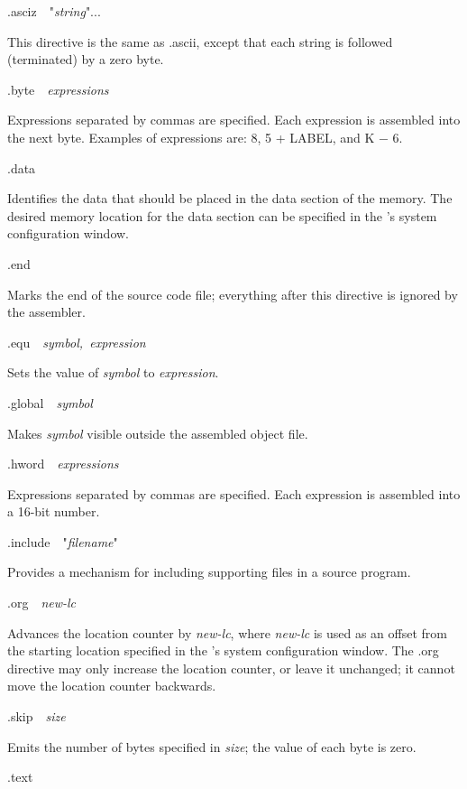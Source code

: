 \documentclass[11pt, twoside, pdftex]{article}
\begin{document}
\noindent
{\sf .asciz}~~"{\it string}"...
 

\noindent
This directive is the same as {\sf .ascii}, except that each string is followed 
(terminated) by a zero byte.
 

\noindent
{\sf .byte}~~{\it expressions}
 

\noindent
Expressions separated by commas are specified. Each expression is assembled into
the next byte. Examples of expressions are: 8, 5 + LABEL, and K $-$ 6.
 
\newpage
\noindent
{\sf .data}
 

\noindent
Identifies the data that should be placed in the data section of the memory.
The desired memory location for the data section can be specified in the
\productNameMed{}'s system configuration window.
 

\noindent
{\sf .end}
 

\noindent
Marks the end of the source code file; everything after this
directive is ignored by the assembler.
 

\noindent
{\sf .equ}~~{\it symbol,~expression}
 

\noindent
Sets the value of {\it symbol} to {\it expression}.
 
\noindent
{\sf .global}~~{\it symbol}
 

\noindent
Makes {\it symbol} visible outside the assembled object file.
 

\noindent
{\sf .hword}~~{\it expressions}
 

\noindent
Expressions separated by commas are specified. Each expression is assembled into
a 16-bit number.
 

\noindent
{\sf .include}~~"{\it filename}"
 

\noindent
Provides a mechanism for including supporting files in a source program.
 

\noindent
{\sf .org}~~{\it new-lc}
 

\noindent
Advances the location counter by {\it new-lc}, where {\it new-lc} is used as
an offset from the starting location specified in the \productNameMed{}'s 
system configuration window. The {\sf .org} directive may only
increase the location counter, or leave it unchanged; it cannot move the
location counter backwards.
 

\noindent
{\sf .skip}~~{\it size}
 

\noindent
Emits the number of bytes specified in {\it size}; the value of each byte is zero.
 

\noindent
{\sf .text}
 
\end{document}
